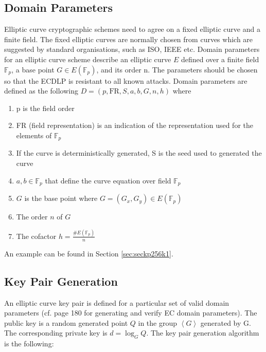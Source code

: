 \subsection{Domain Parameters} \label{domainParameters}
Elliptic curve cryptographic schemes need to agree on a fixed elliptic curve and a finite field. The fixed elliptic curves are normally chosen from curves which are suggested by standard organisations, such as ISO, IEEE etc. Domain parameters for an elliptic curve scheme describe an elliptic curve $E$ defined over a finite field $\mathbb{F}_p$, a base point $G \in E\left( \mathbb{F}_p \right) $, and its order n. The parameters should be chosen so that the ECDLP is resistant to all known attacks. Domain parameters are defined as the following $D=(p,\text{FR},S,a,b,G,n,h)$ where
\begin{small}
\begin{enumerate}
	\item p is the field order
	\item FR (field representation) is an indication of the representation used for the elements of $\mathbb{F}_p$
	\item If the curve is deterministically generated, S is the seed used to generated the curve
	\item $a,b \in \mathbb{F}_p$ that define the curve equation over field $\mathbb{F}_p$
	\item $G$ is the base point where $G = \left( G_x,G_y \right) \in E(\mathbb{F}_p)$
	\item The order $n$ of $G$
	\item The cofactor $h = \frac{\#E(\mathbb{F}_p) }{n}$
\end{enumerate}
\end{small}
An example can be found in Section \ref{sec:seckp256k1}.
\subsection{Key Pair Generation}\label{secKeyPairGen}
An elliptic curve key pair is defined for a particular set of valid domain parameters (cf. \cite{hankerson2006guide} page 180 for generating and verify EC domain parameters). The public key is a random generated point $Q$ in the group $\left\langle G \right\rangle $ generated by G. The corresponding private key is $d = \log_GQ$. The key pair generation algorithm is the following:
 
